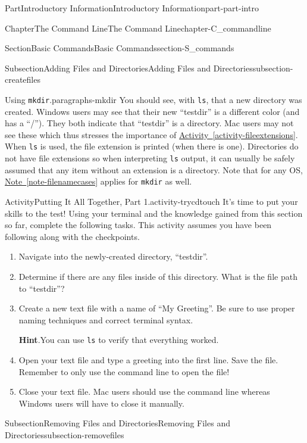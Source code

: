 \documentclass[oneside,10pt,]{book}
\newcommand{\blocktitlefont}{\relax}
\newcommand{\xreffont}{\relax}
\newcommand{\mono}[1]{\texttt{#1}}
\begin{document}
\begin{partptx}{Part}{Introductory Information}{}{Introductory Information}{}{}{part-part-intro}
\begin{chapterptx}{Chapter}{The Command Line}{}{The Command Line}{}{}{chapter-C_commandline}
\begin{sectionptx}{Section}{Basic Commands}{}{Basic Commands}{}{}{section-S_commands}
\begin{subsectionptx}{Subsection}{Adding Files and Directories}{}{Adding Files and Directories}{}{}{subsection-createfiles}
\begin{paragraphs}{Using \mono{mkdir}.}{paragraphs-mkdir}
You should see, with \mono{ls}, that a new directory was created. Windows users may see that their new ``testdir'' is a different color (and has a ``\slash{}''). They both indicate that ``testdir'' is a directory. Mac users may not see these which thus stresses the importance of \hyperref[activity-fileextensions]{Activity~{\xreffont\ref{activity-fileextensions}}}. When \mono{ls} is used, the file extension is printed (when there is one). Directories do not have file extensions so when interpreting \mono{ls} output, it can usually be safely assumed that any item without an extension is a directory. Note that for any OS, \hyperref[note-filenamecases]{Note~{\xreffont\ref{note-filenamecases}}} applies for \mono{mkdir} as well.%
\end{paragraphs}%
\begin{activity}{Activity}{Putting It All Together, Part 1.}{activity-trycdtouch}%
%
It's time to put your skills to the test! Using your terminal and the knowledge gained from this section so far, complete the following tasks. This activity assumes you have been following along with the checkpoints.%
\begin{enumerate}[font=\bfseries,label=(\alph*),ref=\alph*]%
\item{}Navigate into the newly-created directory, ``testdir''.%
\item{}Determine if there are any files inside of this directory. What is the file path to ``testdir''?%
\item{}Create a new text file with a name of ``My Greeting''. Be sure to use proper naming techniques and correct terminal syntax.%
\par\smallskip%
\noindent\textbf{\blocktitlefont Hint}.\hypertarget{hint-trycdtouch-f-b}{}\quad{}You can use \mono{ls} to verify that everything worked.%
\item{}Open your text file and type a greeting into the first line. Save the file. Remember to only use the command line to open the file!%
\item{}Close your text file. Mac users should use the command line whereas Windows users will have to close it manually.%
\end{enumerate}%
\end{activity}%
\end{subsectionptx}
%
%
\typeout{************************************************}
\typeout{************************************************}
%
\begin{subsectionptx}{Subsection}{Removing Files and Directories}{}{Removing Files and Directories}{}{}{subsection-removefiles}

\end{subsectionptx}
\end{sectionptx}
\end{chapterptx}
\end{partptx}
\end{document}
